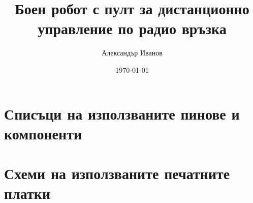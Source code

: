 \documentclass{tu_coursework}
\title{Боен робот с пулт за дистанционно управление по радио връзка}
\author{Александър Иванов}
\date{\today}
\begin{document}

\maketitle
\cleardoublepage





\tableofcontents
\listoffigures
\listoftables
\lstlistoflistings













\appendix
\chapter{Списъци на използваните пинове и компоненти}


\chapter{Схеми на използваните печатните платки}

\end{document}
